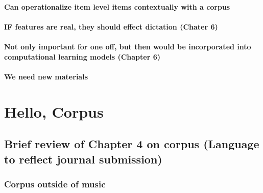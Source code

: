 \documentclass[]{book}
\theoremstyle{definition}
\theoremstyle{definition}
\theoremstyle{definition}
\theoremstyle{remark}
\begin{document}
\hypertarget{can-operationalize-item-level-items-contextually-with-a-corpus}{%
\subsubsection{Can operationalize item level items contextually with a
corpus}\label{can-operationalize-item-level-items-contextually-with-a-corpus}}

\hypertarget{if-features-are-real-they-should-effect-dictation-chater-6}{%
\subsubsection{IF features are real, they should effect dictation
(Chater
6)}\label{if-features-are-real-they-should-effect-dictation-chater-6}}

\hypertarget{not-only-important-for-one-off-but-then-would-be-incorporated-into-computational-learning-models-chapter-6}{%
\subsubsection{Not only important for one off, but then would be
incorporated into computational learning models (Chapter
6)}\label{not-only-important-for-one-off-but-then-would-be-incorporated-into-computational-learning-models-chapter-6}}

\hypertarget{we-need-new-materials}{%
\subsubsection{We need new materials}\label{we-need-new-materials}}

\hypertarget{hello-corpus}{%
\chapter{Hello, Corpus}\label{hello-corpus}}

\hypertarget{brief-review-of-chapter-4-on-corpus-language-to-reflect-journal-submission}{%
\section{Brief review of Chapter 4 on corpus (Language to reflect
journal
submission)}\label{brief-review-of-chapter-4-on-corpus-language-to-reflect-journal-submission}}

\hypertarget{corpus-outside-of-music}{%
\subsection{Corpus outside of music}\label{corpus-outside-of-music}}
\end{document}
